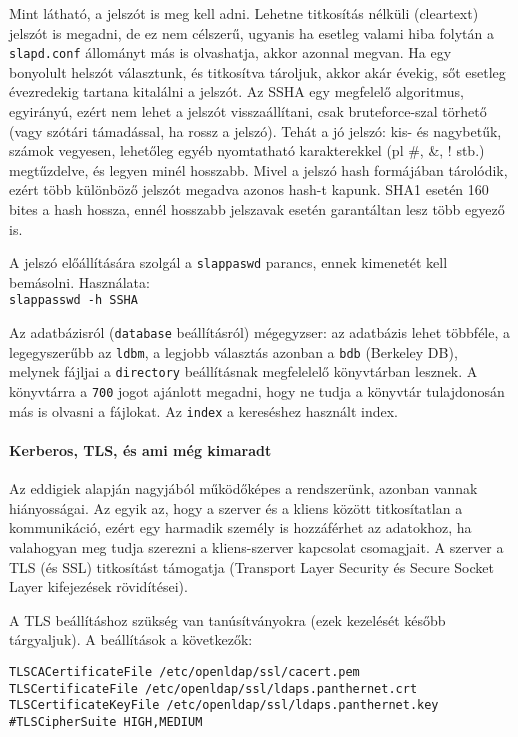 Mint látható, a jelszót is meg kell adni. Lehetne titkosítás nélküli (cleartext) jelszót is megadni, de ez nem
célszerű, ugyanis ha esetleg valami hiba folytán a \texttt{slapd.conf} állományt más is olvashatja, akkor azonnal
megvan. Ha egy bonyolult helszót választunk, és titkosítva tároljuk, akkor akár évekig, sőt esetleg évezredekig
tartana kitalálni a jelszót. Az SSHA egy megfelelő algoritmus, egyirányú, ezért
nem lehet a jelszót visszaállítani, csak bruteforce-szal törhető (vagy szótári támadással, ha rossz a jelszó). Tehát a
jó jelszó: kis-  és nagybetűk, számok vegyesen, lehetőleg egyéb nyomtatható karakterekkel (pl \#, \&, ! stb.)
megtűzdelve, és legyen minél hosszabb. Mivel a jelszó hash formájában tárolódik, ezért több különböző jelszót megadva
azonos hash-t kapunk. SHA1 esetén 160 bites a hash hossza, ennél hosszabb jelszavak esetén garantáltan lesz több
egyező is.


A jelszó előállítására szolgál a \texttt{slappaswd} parancs, ennek kimenetét kell bemásolni. Használata:\\
\texttt{slappasswd -h {SSHA}}


Az adatbázisról (\texttt{database} beállításról) mégegyzser: az adatbázis lehet többféle, a legegyszerűbb az
\texttt{ldbm}, a legjobb választás azonban a  \texttt{bdb} (Berkeley DB), melynek fájljai a \texttt{directory}
beállításnak megfelelelő könyvtárban lesznek. A könyvtárra a \texttt{700} jogot ajánlott megadni, hogy ne tudja a
könyvtár tulajdonosán más is olvasni a fájlokat. Az  \texttt{index} a  kereséshez használt index.

\paragraph{Kerberos, TLS, és ami még kimaradt} Az eddigiek alapján nagyjából működőképes a rendszerünk, azonban vannak
hiányosságai. Az egyik az, hogy a szerver és a kliens között titkosítatlan a kommunikáció, ezért egy harmadik személy
is hozzáférhet az adatokhoz, ha valahogyan meg tudja szerezni a kliens-szerver kapcsolat csomagjait. A szerver a TLS
(és SSL) titkosítást támogatja (Transport Layer Security és Secure Socket Layer kifejezések rövidítései).

A TLS beállításhoz szükség van tanúsítványokra (ezek kezelését később tárgyaljuk). A beállítások a következők:

\begin{Verbatim}[frame=single]
TLSCACertificateFile /etc/openldap/ssl/cacert.pem
TLSCertificateFile /etc/openldap/ssl/ldaps.panthernet.crt
TLSCertificateKeyFile /etc/openldap/ssl/ldaps.panthernet.key
#TLSCipherSuite HIGH,MEDIUM
\end{Verbatim}  

